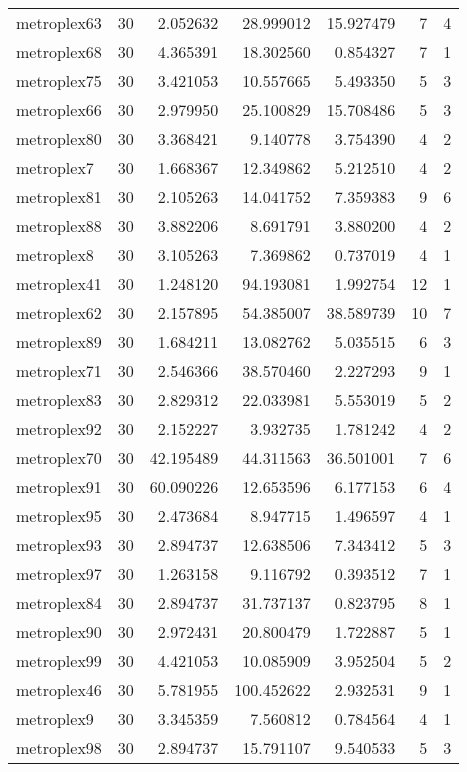 \documentclass[../../../thesis.tex]{subfiles}
\begin{document}
\begin{longtable}{|l|r|r|r|r|r|r|}
metroplex63 & 30 & 2.052632 & 28.999012 & 15.927479 & 7 & 4 \\
metroplex68 & 30 & 4.365391 & 18.302560 & 0.854327 & 7 & 1 \\
metroplex75 & 30 & 3.421053 & 10.557665 & 5.493350 & 5 & 3 \\
metroplex66 & 30 & 2.979950 & 25.100829 & 15.708486 & 5 & 3 \\
metroplex80 & 30 & 3.368421 & 9.140778 & 3.754390 & 4 & 2 \\
metroplex7 & 30 & 1.668367 & 12.349862 & 5.212510 & 4 & 2 \\
metroplex81 & 30 & 2.105263 & 14.041752 & 7.359383 & 9 & 6 \\
metroplex88 & 30 & 3.882206 & 8.691791 & 3.880200 & 4 & 2 \\
metroplex8 & 30 & 3.105263 & 7.369862 & 0.737019 & 4 & 1 \\
metroplex41 & 30 & 1.248120 & 94.193081 & 1.992754 & 12 & 1 \\
metroplex62 & 30 & 2.157895 & 54.385007 & 38.589739 & 10 & 7 \\
metroplex89 & 30 & 1.684211 & 13.082762 & 5.035515 & 6 & 3 \\
metroplex71 & 30 & 2.546366 & 38.570460 & 2.227293 & 9 & 1 \\
metroplex83 & 30 & 2.829312 & 22.033981 & 5.553019 & 5 & 2 \\
metroplex92 & 30 & 2.152227 & 3.932735 & 1.781242 & 4 & 2 \\
metroplex70 & 30 & 42.195489 & 44.311563 & 36.501001 & 7 & 6 \\
metroplex91 & 30 & 60.090226 & 12.653596 & 6.177153 & 6 & 4 \\
metroplex95 & 30 & 2.473684 & 8.947715 & 1.496597 & 4 & 1 \\
metroplex93 & 30 & 2.894737 & 12.638506 & 7.343412 & 5 & 3 \\
metroplex97 & 30 & 1.263158 & 9.116792 & 0.393512 & 7 & 1 \\
metroplex84 & 30 & 2.894737 & 31.737137 & 0.823795 & 8 & 1 \\
metroplex90 & 30 & 2.972431 & 20.800479 & 1.722887 & 5 & 1 \\
metroplex99 & 30 & 4.421053 & 10.085909 & 3.952504 & 5 & 2 \\
metroplex46 & 30 & 5.781955 & 100.452622 & 2.932531 & 9 & 1 \\
metroplex9 & 30 & 3.345359 & 7.560812 & 0.784564 & 4 & 1 \\
metroplex98 & 30 & 2.894737 & 15.791107 & 9.540533 & 5 & 3 \\

\end{longtable}
\end{document}
